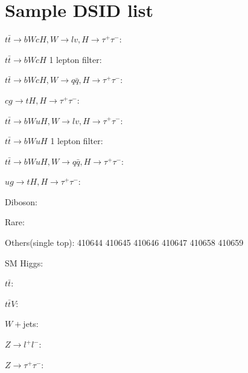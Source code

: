 \section{Sample DSID list}
\label{sec:DSIDlist}
$t\bar{t}\to bWcH, W\to lv, H\to\tau^+\tau^-$: 

$t\bar{t}\to bWcH$ 1 lepton filter: 

$t\bar{t}\to bWcH, W\to q\bar{q}, H\to\tau^+\tau^-$: 

$cg\to tH, H\to\tau^+\tau^-$: 

$t\bar{t}\to bWuH, W\to lv, H\to\tau^+\tau^-$: 

$t\bar{t}\to bWuH$ 1 lepton filter: 

$t\bar{t}\to bWuH, W\to q\bar{q}, H\to\tau^+\tau^-$: 

$ug\to tH, H\to\tau^+\tau^-$: 

Diboson: 

Rare: 

Others(single top): 410644 410645 410646 410647 410658 410659

SM Higgs: 

$t\bar{t}$: 

$t\bar{t}V$: 

$W+$jets: 

$Z\to l^+l^-$: 

$Z\to\tau^+\tau^-$: 